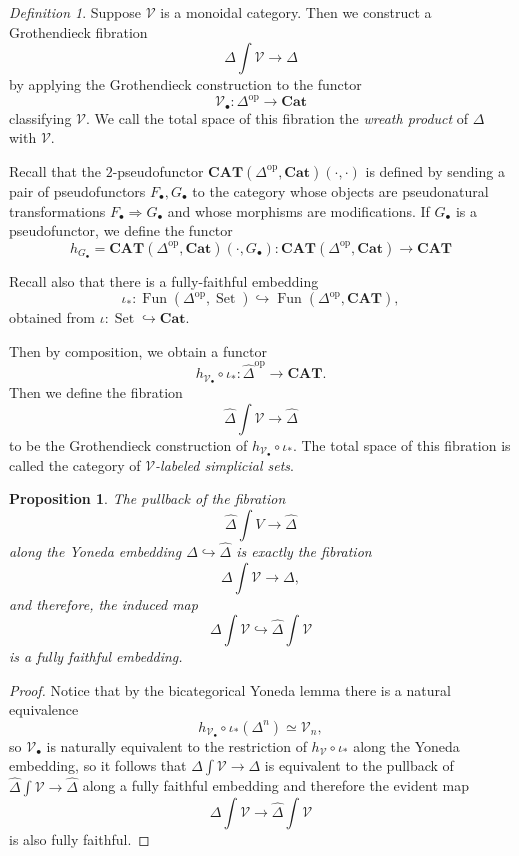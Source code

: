 \documentclass{amsart}
\numberwithin{equation}{section}
\theoremstyle{plain}   %
\newtheorem{prop}[subsection]{Proposition}
\theoremstyle{remark}
\newtheorem{defn}[subsection]{Definition}
\theoremstyle{plain}
\newcommand{\op}{\ensuremath{\mathrm{op}}}
\newcommand{\Cat}{\ensuremath{\mathbf{Cat}}}
\newcommand{\psh}[1]{\ensuremath{\widehat{#1}}}
\begin{document}
\begin{defn}
	Suppose \(\mathcal{V}\) is a monoidal category.  Then we construct a Grothendieck fibration \[\Delta\int\mathcal{V}\to \Delta\] by applying the Grothendieck construction to the functor \[\mathcal{V}_\bullet:\Delta^\op\to \Cat\] classifying \(\mathcal{V}\). We call the total space of this fibration the \emph{wreath product} of \(\Delta\) with \(\mathcal{V}\).

	Recall that the \(2\)-pseudofunctor \(\mathbf{CAT}(\Delta^\op, \Cat)(\cdot,\cdot)\) is defined by sending a pair of pseudofunctors \(F_\bullet,G_\bullet\) to the category whose objects are pseudonatural transformations \(F_\bullet\Rightarrow G_\bullet\) and whose morphisms are modifications. If \(G_\bullet\) is a pseudofunctor, we define the functor \[h_{G_\bullet}=\mathbf{CAT}(\Delta^\op, \Cat)(\cdot,G_\bullet):\mathbf{CAT}(\Delta^\op, \Cat)\to \mathbf{CAT}\]

	Recall also that there is a fully-faithful embedding \[\iota_*:\operatorname{Fun}(\Delta^\op,\operatorname{Set}) \hookrightarrow \operatorname{Fun}(\Delta^\op,\mathbf{CAT}),\] obtained from \(\iota:\operatorname{Set} \hookrightarrow \Cat\).

	Then by composition, we obtain a functor \[h_{\mathcal{V}_\bullet}\circ \iota_*: \psh{\Delta}^\op \to \mathbf{CAT}.\] Then we define the fibration \[\psh{\Delta}\int \mathcal{V} \to \psh{\Delta}\] to be the Grothendieck construction of \(h_{\mathcal{V}_\bullet}\circ\iota_*\). The total space of this fibration is called the category of \emph{\(\mathcal{V}\)-labeled simplicial sets}.
\end{defn}

\begin{prop} The pullback of the fibration \[\psh{\Delta}\int V \to \psh{\Delta}\] along the Yoneda embedding \(\Delta\hookrightarrow \psh{\Delta}\) is exactly the fibration \[\Delta\int\mathcal{V}\to \Delta,\] and therefore, the induced map \[\Delta\int\mathcal{V}\hookrightarrow \psh{\Delta}\int\mathcal{V}\] is a fully faithful embedding.
\end{prop}
\begin{proof}    Notice that by the bicategorical Yoneda lemma there is a natural equivalence \[h_{\mathcal{V}_\bullet}\circ \iota_*(\Delta^n)\simeq \mathcal{V}_n,\] so \(\mathcal{V}_\bullet\) is naturally equivalent to the restriction of \(h_\mathcal{V}\circ \iota_*\) along the Yoneda embedding, so it follows that \(\Delta\int \mathcal{V} \to \Delta\) is equivalent to the pullback of \(\psh{\Delta}\int \mathcal{V} \to \psh{\Delta}\) along a fully faithful embedding and therefore the evident map \[\Delta\int \mathcal{V} \to \psh{\Delta}\int \mathcal{V}\] is also fully faithful.
\end{proof}
\end{document}
